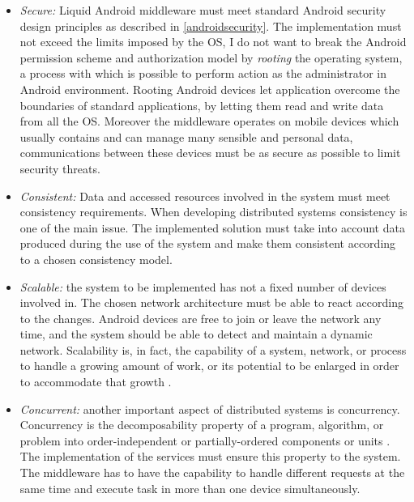 \begin{itemize}
	\item \textit{Secure:} Liquid Android middleware must meet standard Android security design principles as described in \ref{androidsecurity}. The implementation must not exceed the limits imposed by the OS, I do not want to break the Android permission scheme and authorization model by \textit{rooting} the operating system, a process with which is possible to perform action as the administrator in Android environment. Rooting Android devices let application overcome the boundaries of standard applications, by letting them read and write data from all the OS. Moreover the middleware operates on mobile devices which usually contains and can manage many sensible and personal data, communications between these devices must be as secure as possible to limit security threats.
	
	\item \textit{Consistent:} Data and accessed resources involved in the system must meet consistency requirements. When developing distributed systems consistency is one of the main issue. The implemented solution must take into account data produced during the use of the system and make them consistent according to a chosen consistency model.
	
	\item \textit{Scalable:} the system to be implemented has not a fixed number of devices involved in. The chosen network architecture must be able to react according to the changes. Android devices are free to join or leave the network any time, and the system should be able to detect and maintain a dynamic network. Scalability is, in fact, the capability of a system, network, or process to handle a growing amount of work, or its potential to be enlarged in order to accommodate that growth \cite{bondi2000characteristics}. 
	
	\item \textit{Concurrent:} another important aspect of distributed systems is concurrency. Concurrency is the decomposability property of a program, algorithm, or problem into order-independent or partially-ordered components or units \cite{lamport1978time}. The implementation of the services must ensure this property to the system. The middleware has to have the capability to handle different requests at the same time and execute task in more than one device simultaneously.
	
\end{itemize}
